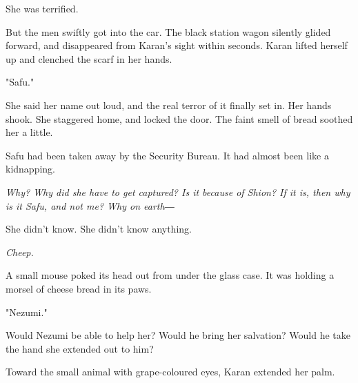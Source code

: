 She was terrified.

But the men swiftly got into the car. The black station wagon silently
glided forward, and disappeared from Karan's sight within seconds. Karan
lifted herself up and clenched the scarf in her hands.

"Safu."

She said her name out loud, and the real terror of it finally set in.
Her hands shook. She staggered home, and locked the door. The faint
smell of bread soothed her a little.

Safu had been taken away by the Security Bureau. It had almost been like
a kidnapping.

\emph{Why? Why did she have to get captured? Is it because of Shion? If it is,
then why is it Safu, and not me? Why on earth―}

She didn't know. She didn't know anything.

\emph{Cheep.}

A small mouse poked its head out from under the glass case. It was
holding a morsel of cheese bread in its paws.

"Nezumi."

Would Nezumi be able to help her? Would he bring her salvation? Would he
take the hand she extended out to him?

Toward the small animal with grape-coloured eyes, Karan extended her
palm.
